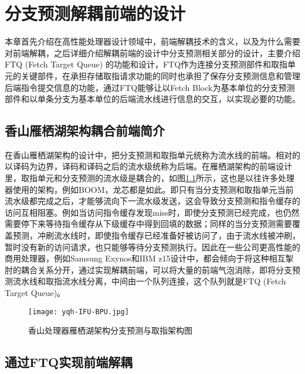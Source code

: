 \chapter{分支预测解耦前端的设计}

本章首先介绍在高性能处理器设计领域中，前端解耦技术的含义，以及为什么需要对前端解耦，之后详细介绍解耦前端的设计中分支预测相关部分的设计，主要介绍FTQ (Fetch Target Queue) 的功能和设计，FTQ作为连接分支预测部件和取指单元的关键部件，在承担存储取指请求功能的同时也承担了保存分支预测信息和管理后端指令提交信息的功能，通过FTQ能够让以Fetch Block为基本单位的分支预测部件和以单条分支为基本单位的后端流水线进行信息的交互，以实现必要的功能。

\section{香山雁栖湖架构耦合前端简介}


在香山雁栖湖架构的设计中，把分支预测和取指单元统称为流水线的前端。相对的以译码为边界，译码和译码之后的流水级统称为后端。在雁栖湖架构的前端设计里，取指单元和分支预测的流水级是耦合的，如图\ref{fig:figure41}所示，这也是以往许多处理器使用的架构，例如BOOM\cite{boom-spec}，龙芯\cite{loongson}都是如此。即只有当分支预测和取指单元当前流水级都完成之后，才能够流向下一流水级发送，这会导致分支预测和指令缓存的访问互相阻塞。例如当访问指令缓存发现miss时，即使分支预测已经完成，也仍然需要停下来等待指令缓存从下级缓存中得到回填的数据；同样的当分支预测需要覆盖预测，冲刷流水线时，即使指令缓存已经准备好被访问了，由于流水线被冲刷，暂时没有新的访问请求，也只能够等待分支预测执行。因此在一些公司更高性能的商用处理器，例如Samsung Exynos\cite{samsung-exynos}和IBM z15\cite{ibm-z15}设计中，都会倾向于将这种相互掣肘的耦合关系分开，通过实现解耦前端，可以将大量的前端气泡消除，即将分支预测流水线和取指流水线分离，中间由一个队列连接，这个队列就是FTQ (Fetch Target Queue)。

\begin{figure}[htb]
	\centering
	\setlength\tabcolsep{3pt}  %
	\vspace{5pt} %
	\texttt{[image: yqh-IFU-BPU.jpg]}
	\caption{香山处理器雁栖湖架构分支预测与取指架构图}
    \label{fig:figure41}
\end{figure}

\section{通过FTQ实现前端解耦}

